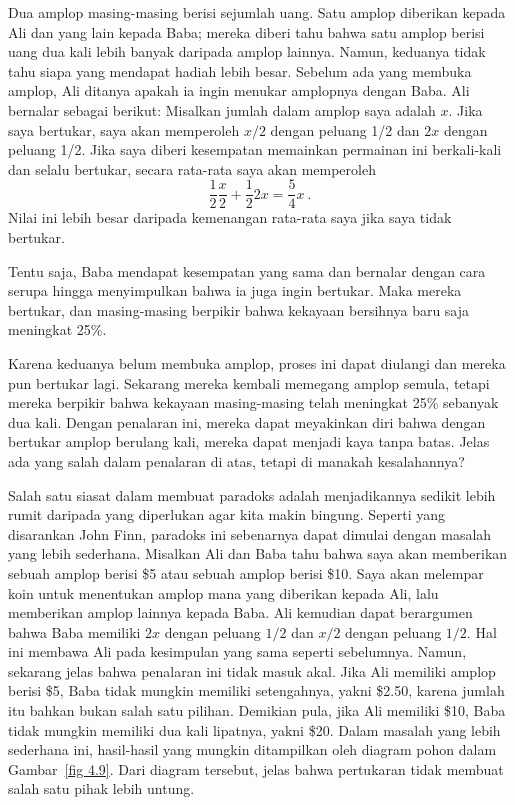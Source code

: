 \begin{example}\label{exam 4.3.4}
Dua amplop masing-masing berisi sejumlah uang.  Satu amplop diberikan kepada
Ali dan yang lain kepada Baba; mereka diberi tahu bahwa satu
amplop berisi uang dua kali lebih banyak daripada amplop lainnya.  Namun, keduanya
tidak tahu siapa yang mendapat hadiah lebih besar.  Sebelum ada yang membuka amplop,
Ali ditanya apakah ia ingin menukar amplopnya dengan Baba.  Ali bernalar sebagai
berikut: Misalkan jumlah dalam amplop saya adalah $x$.  Jika saya bertukar, saya akan
memperoleh $x/2$ dengan peluang 1/2 dan $2x$ dengan peluang 1/2.  Jika saya diberi
kesempatan memainkan permainan ini berkali-kali dan selalu bertukar, secara rata-rata
saya akan memperoleh
$$
\frac 12 \frac x2 + \frac 12 2x = \frac 54 x\ .
$$
Nilai ini lebih besar daripada kemenangan rata-rata saya jika saya tidak bertukar.
\par
Tentu saja, Baba mendapat kesempatan yang sama dan bernalar dengan cara serupa hingga
menyimpulkan bahwa ia juga ingin bertukar.  Maka mereka bertukar, dan masing-masing
berpikir bahwa kekayaan bersihnya baru saja meningkat 25\%.
\par
Karena keduanya belum membuka amplop, proses ini dapat diulangi dan mereka pun
bertukar lagi.  Sekarang mereka kembali memegang amplop semula, tetapi mereka berpikir
bahwa kekayaan masing-masing telah meningkat 25\% sebanyak dua kali.  Dengan penalaran
ini, mereka dapat meyakinkan diri bahwa dengan bertukar amplop berulang kali, mereka
dapat menjadi kaya tanpa batas.  Jelas ada yang salah dalam penalaran di atas, tetapi
di manakah kesalahannya?
\par
Salah satu siasat dalam membuat paradoks adalah menjadikannya sedikit lebih rumit
daripada yang diperlukan agar kita makin bingung.  Seperti yang disarankan John
Finn, paradoks ini sebenarnya dapat dimulai dengan masalah yang lebih
sederhana.  Misalkan Ali dan Baba tahu bahwa saya akan memberikan sebuah amplop
berisi \$5 atau sebuah amplop berisi \$10.  Saya akan melempar koin untuk menentukan
amplop mana yang diberikan kepada Ali, lalu memberikan amplop lainnya kepada Baba.
Ali kemudian dapat berargumen bahwa Baba memiliki $2x$ dengan peluang $1/2$ dan $x/2$
dengan peluang $1/2$.  Hal ini membawa Ali pada kesimpulan yang sama seperti
sebelumnya.  Namun, sekarang jelas bahwa penalaran ini tidak masuk akal. Jika Ali
memiliki amplop berisi \$5, Baba tidak mungkin memiliki setengahnya, yakni \$2.50,
karena jumlah itu bahkan bukan salah satu pilihan.  Demikian pula, jika Ali memiliki
\$10, Baba tidak mungkin memiliki dua kali lipatnya, yakni \$20. Dalam masalah yang
lebih sederhana ini, hasil-hasil yang mungkin ditampilkan oleh diagram pohon dalam
Gambar~\ref{fig 4.9}.
Dari diagram tersebut, jelas bahwa pertukaran tidak membuat salah satu pihak lebih untung.
\end{example}

